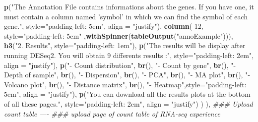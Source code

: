 \documentclass[
  12pt,
]{article}
\newenvironment{Shaded}{\begin{snugshade}}{\end{snugshade}}
\newcommand{\CommentTok}[1]{\textcolor[rgb]{0.56,0.35,0.01}{\textit{#1}}}
\newcommand{\DataTypeTok}[1]{\textcolor[rgb]{0.13,0.29,0.53}{#1}}
\newcommand{\DecValTok}[1]{\textcolor[rgb]{0.00,0.00,0.81}{#1}}
\newcommand{\KeywordTok}[1]{\textcolor[rgb]{0.13,0.29,0.53}{\textbf{#1}}}
\newcommand{\NormalTok}[1]{#1}
\newcommand{\StringTok}[1]{\textcolor[rgb]{0.31,0.60,0.02}{#1}}
\begin{document}
\begin{Shaded}
\begin{Highlighting}[]
                      \KeywordTok{p}\NormalTok{(}\StringTok{"The Annotation File contains informations about the genes. If you have one, it must }
\StringTok{                        contain a column named 'symbol' in which we can find the symbol of each gene."}\NormalTok{,}
                        \DataTypeTok{style=}\StringTok{"padding-left: 5em"}\NormalTok{, }\DataTypeTok{align =} \StringTok{"justify"}\NormalTok{),}
                      \KeywordTok{column}\NormalTok{( }\DecValTok{12}\NormalTok{, }\DataTypeTok{style=}\StringTok{"padding-left: 5em"}\NormalTok{ ,}\KeywordTok{withSpinner}\NormalTok{(}\KeywordTok{tableOutput}\NormalTok{(}\StringTok{"annoExample"}\NormalTok{))),}
                      \KeywordTok{h3}\NormalTok{(}\StringTok{"2. Results"}\NormalTok{, }\DataTypeTok{style=}\StringTok{"padding-left: 1em"}\NormalTok{),}
                      \KeywordTok{p}\NormalTok{(}\StringTok{"The results will be display after running DESeq2. You will obtain 9 differents }
\StringTok{                        results :"}\NormalTok{, }\DataTypeTok{style=}\StringTok{"padding-left: 2em"}\NormalTok{, }\DataTypeTok{align =} \StringTok{"justify"}\NormalTok{),}
                      \KeywordTok{p}\NormalTok{(}\StringTok{"- Count distribution"}\NormalTok{,}
                        \KeywordTok{br}\NormalTok{(), }\StringTok{"- Count by gene"}\NormalTok{,}
                        \KeywordTok{br}\NormalTok{(), }\StringTok{"- Depth of sample"}\NormalTok{,}
                        \KeywordTok{br}\NormalTok{(), }\StringTok{"- Dispersion"}\NormalTok{,}
                        \KeywordTok{br}\NormalTok{(), }\StringTok{"- PCA"}\NormalTok{,}
                        \KeywordTok{br}\NormalTok{(), }\StringTok{"- MA plot"}\NormalTok{,}
                        \KeywordTok{br}\NormalTok{(), }\StringTok{"- Volcano plot"}\NormalTok{,}
                        \KeywordTok{br}\NormalTok{(), }\StringTok{"- Distance matrix"}\NormalTok{,}
                        \KeywordTok{br}\NormalTok{(), }\StringTok{"- Heatmap"}\NormalTok{,}\DataTypeTok{style=}\StringTok{"padding-left: 5em"}\NormalTok{, }\DataTypeTok{align =} \StringTok{"justify"}\NormalTok{),}
                      \KeywordTok{p}\NormalTok{(}\StringTok{"You can download all the results plots at the bottom of all these pages."}\NormalTok{,  }
                        \DataTypeTok{style=}\StringTok{"padding-left: 2em"}\NormalTok{, }\DataTypeTok{align =} \StringTok{"justify"}\NormalTok{)}
\NormalTok{                      )}
\NormalTok{                    ),}
            \CommentTok{### Upload count table ----}
            \CommentTok{### upload page of count table of RNA-seq experience}

\end{Highlighting}
\end{Shaded}
\end{document}
